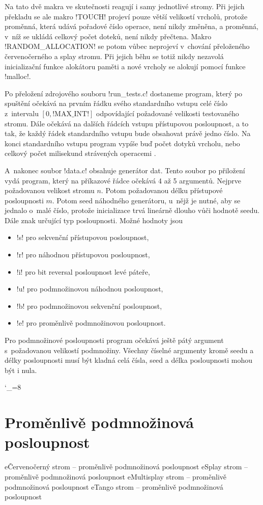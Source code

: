 Na tato dvě makra ve skutečnosti reagují i samy jednotlivé stromy. Při jejich
překladu se ale makro !TOUCH! projeví pouze větší velikostí vrcholů, protože
proměnná, která udává pořadové číslo operace, není nikdy změněna, a proměnná,
v~níž se ukládá celkový počet doteků, není nikdy přečtena. Makro
!RANDOM_ALLOCATION! se potom vůbec neprojeví v~chování přeloženého
červenočerného a splay stromu. Při jejich běhu se totiž nikdy nezavolá
inicializační funkce alokátoru paměti a nové vrcholy se alokují pomocí funkce
!malloc!.

Po přeložení zdrojového souboru !run_tests.c! dostaneme program, který po
spuštění očekává na prvním řádku svého standardního vstupu celé číslo
z~intervalu $[0, \text{!MAX_INT!}]$ odpovídající požadované velikosti testovaného stromu. Dále
očekává na dalších řádcích vstupu přístupovou posloupnost, a to tak, že každý
řádek standardního vstupu bude obsahovat právě jedno číslo. Na konci
standardního vstupu program vypíše buď počet dotyků vrcholu, nebo celkový
počet milisekund strávených operacemi .

A~nakonec soubor !data.c! obsahuje generátor dat. Tento soubor po přiložení vydá program, který na příkazové řádce očekává 4 až 5 argumentů. Nejprve požadovanou velikost stromu $n$. Potom požadovanou délku přístupové posloupnosti $m$. Potom seed náhodného generátoru, u~nějž je nutné, aby se jednalo o~malé číslo, protože inicializace trvá lineárně dlouho vůči hodnotě seedu. Dále znak určující typ posloupnosti. Možné hodnoty jsou

\begin{itemize}
\item !s! pro sekvenční přístupovou posloupnost,
\item !r! pro náhodnou přístupovou posloupnost,
\item !i! pro bit reversal posloupnost levé páteře,
\item !u! pro podmnožinovou náhodnou posloupnost,
\item !b! pro podmnožinovou sekvenční posloupnost,
\item !e! pro proměnlivě podmnožinovou posloupnost.
\end{itemize}

Pro podmnožinové posloupnosti program očekává ještě pátý argument s~požadovanou velikostí podmnožiny. Všechny číselné argumenty kromě seedu a délky posloupnosti musí být kladná celá čísla, seed a délka posloupnosti mohou být i nula.

\catcode`_=8

\openright
\section{Proměnlivě podmnožinová posloupnost}\label{sec:app2}
{\def\dira#1{}
e{Červenočerný strom -- proměnlivě podmnožinová posloupnost}
}
e{Splay strom -- proměnlivě podmnožinová posloupnost}
e{Multisplay strom -- proměnlivě podmnožinová posloupnost}
e{Tango strom -- proměnlivě podmnožinová posloupnost}

